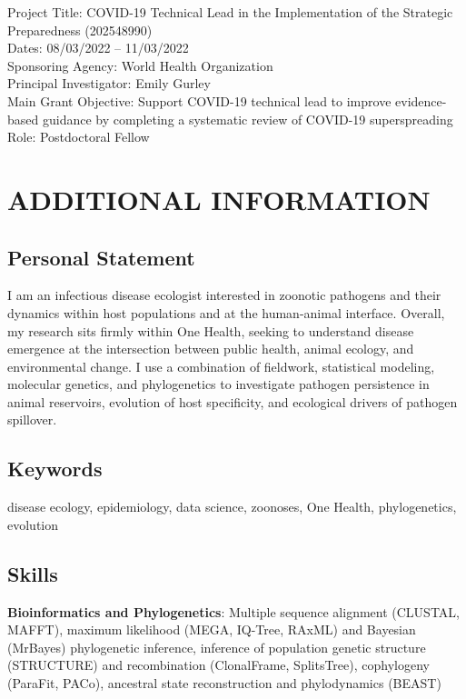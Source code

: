 \documentclass{cv}
\begin{document}
Project Title: COVID-19 Technical Lead in the Implementation of the Strategic Preparedness (202548990) \\
Dates: 08/03/2022 -- 11/03/2022 \\
Sponsoring Agency: World Health Organization \\
Principal Investigator: Emily Gurley \\
Main Grant Objective: Support COVID-19 technical lead to improve evidence-based guidance by completing a systematic review of COVID-19 superspreading \\
Role: Postdoctoral Fellow


\section*{ADDITIONAL INFORMATION}

\subsection*{Personal Statement}

I am an infectious disease ecologist interested in zoonotic pathogens and their dynamics within host populations and at the human-animal interface. Overall, my research sits firmly within One Health, seeking to understand disease emergence at the intersection between public health, animal ecology, and environmental change. I use a combination of fieldwork, statistical modeling, molecular genetics, and phylogenetics to investigate pathogen persistence in animal reservoirs, evolution of host specificity, and ecological drivers of pathogen spillover.

\subsection*{Keywords}

disease ecology, epidemiology, data science, zoonoses, One Health, phylogenetics, evolution

\subsection*{Skills}

\textbf{Bioinformatics and Phylogenetics}: Multiple sequence alignment (CLUSTAL, MAFFT), maximum likelihood (MEGA, IQ-Tree, RAxML) and Bayesian (MrBayes) phylogenetic inference, inference of population genetic structure (STRUCTURE) and recombination (ClonalFrame, SplitsTree), cophylogeny (ParaFit, PACo), ancestral state reconstruction and phylodynamics (BEAST)
\end{document}
